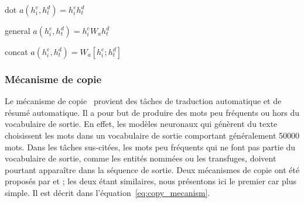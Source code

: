     dot $a(h^e_i, h^d_t) = h^e_i h^d_t$
    
    general $a(h^e_i, h^d_t) = h^e_i W_a h^d_t$
    
    concat $a(h^e_i, h^d_t) = W_a [h^e_i;h^d_t]$
\fi

\subsubsection{Mécanisme de copie}
\label{sub:copy_mecanism}

Le mécanisme de copie~\cite{see_get_2017,gu_incorporating_2016} provient des tâches de traduction automatique et de résumé automatique. Il a pour but de produire des mots peu fréquents ou hors du vocabulaire de sortie.
En effet, les modèles neuronaux qui génèrent du texte choisissent les mots dans un vocabulaire de sortie comportant généralement \num{50 000} mots.
Dans les tâches sus-citées, les mots peu fréquents qui ne font pas partie du vocabulaire de sortie, comme les entités nommées ou les transfuges, doivent pourtant apparaître dans la séquence de sortie.
Deux mécanismes de copie ont été proposés par \citet{see_get_2017} et \citet{gu_incorporating_2016}; les deux étant similaires, nous présentons ici le premier car plus simple. Il est décrit dans l'équation~\ref{eq:copy_mecanism}.

%

